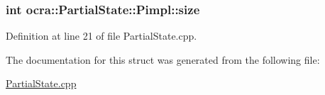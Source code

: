 \subsubsection[{\texorpdfstring{size}{size}}]{\setlength{\rightskip}{0pt plus 5cm}int ocra\+::\+Partial\+State\+::\+Pimpl\+::size}\hypertarget{structocra_1_1PartialState_1_1Pimpl_ac60f12a932c9bac309b2c1794de57a9c}{}\label{structocra_1_1PartialState_1_1Pimpl_ac60f12a932c9bac309b2c1794de57a9c}


Definition at line 21 of file Partial\+State.\+cpp.



The documentation for this struct was generated from the following file\+:\begin{DoxyCompactItemize}
\item 
\hyperlink{PartialState_8cpp}{Partial\+State.\+cpp}\end{DoxyCompactItemize}
